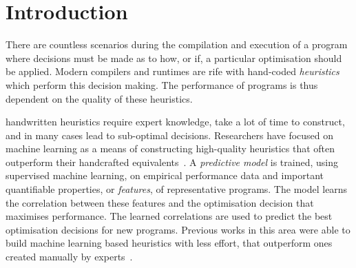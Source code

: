 \section{Introduction}

%
%
%

There are countless scenarios during the compilation and execution of a program where decisions must be made as to how, or if, a particular optimisation should be applied. Modern compilers and runtimes are rife with hand-coded \emph{heuristics} which perform this decision making. The performance of programs is thus dependent on the quality of these heuristics.

handwritten heuristics require expert knowledge, take a lot of time to construct, and in many cases lead to sub-optimal decisions. Researchers have focused on machine learning as a means of constructing high-quality heuristics that often outperform their handcrafted equivalents~\cite{Micolet2016,Falch2015,Stephenson2005,Agakov,Cummins2016a}. A \emph{predictive model} is trained, using supervised machine learning, on empirical performance data and important quantifiable properties, or \emph{features}, of representative programs. The model learns the correlation between these features and the optimisation decision that maximises performance. The learned correlations are used to predict the best optimisation decisions for new programs. Previous works in this area were able to build machine learning based heuristics with less effort, that outperform ones created manually by experts~\cite{Grewe2013,Magni2014}.

